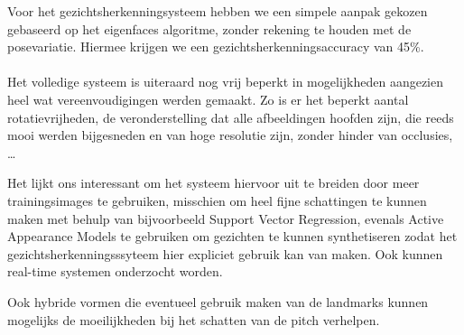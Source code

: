 \documentclass[a4paper,dutch,11pt]{scrartcl}
\begin{document}
Voor het gezichtsherkenningsysteem hebben we een simpele aanpak gekozen gebaseerd op het eigenfaces algoritme, zonder rekening te houden met de posevariatie. Hiermee krijgen we een gezichtsherkenningsaccuracy van 45\%.
\paragraph{}
Het volledige systeem is uiteraard nog vrij beperkt in mogelijkheden aangezien heel wat vereenvoudigingen werden gemaakt. Zo is er het beperkt aantal rotatievrijheden, de veronderstelling dat alle afbeeldingen hoofden zijn, die reeds mooi werden bijgesneden en van hoge resolutie zijn, zonder hinder van occlusies, \ldots{}

Het lijkt ons interessant om het systeem hiervoor uit te breiden door meer trainingsimages te gebruiken, misschien om heel fijne schattingen te kunnen maken met behulp van bijvoorbeeld Support Vector Regression, evenals Active Appearance Models te gebruiken om gezichten te kunnen synthetiseren zodat het gezichtsherkenningsssyteem hier expliciet gebruik kan van maken. Ook kunnen real-time systemen onderzocht worden. 

Ook hybride vormen die eventueel gebruik maken van de landmarks kunnen mogelijks de moeilijkheden bij het schatten van de pitch verhelpen.


\clearpage




\clearpage

\appendix
\end{document}
